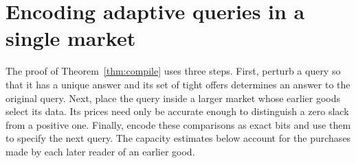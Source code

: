 \documentclass[11pt]{article}
\begin{document}
\appendix
\section{Encoding adaptive queries in a single market}\label{sec:compile}


The proof of Theorem~\ref{thm:compile} uses three steps. First, perturb a
query so that it has a unique answer and its set of tight offers determines
an answer to the original query. Next, place the query inside a larger market
whose earlier goods select its data. Its prices need only be accurate enough
to distinguish a zero slack from a positive one. Finally, encode these
comparisons as exact bits and use them to specify the next query. The
capacity estimates below account for the purchases made by each later
reader of an earlier good.
\end{document}
